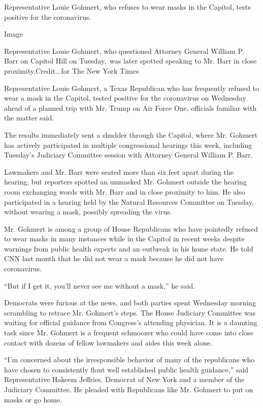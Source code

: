 Representative Louie Gohmert, who refuses to wear masks in the Capitol,
tests positive for the coronavirus.

Image

Representative Louie Gohmert, who questioned Attorney General William P.
Barr on Capitol Hill on Tuesday,~was later spotted speaking to Mr. Barr
in close proximity.Credit...for The New York Times

Representative Louie Gohmert, a Texas Republican who has frequently
refused to wear a mask in the Capitol, tested positive for the
coronavirus on Wednesday ahead of a planned trip with Mr. Trump on Air
Force One, officials familiar with the matter said.

The results immediately sent a shudder through the Capitol, where Mr.
Gohmert has actively participated in multiple congressional hearings
this week, including Tuesday's Judiciary Committee session with Attorney
General William P. Barr.

Lawmakers and Mr. Barr were seated more than six feet apart during the
hearing, but reporters spotted an unmasked Mr. Gohmert outside the
hearing room exchanging words with Mr. Barr and in close proximity to
him. He also participated in a hearing held by the Natural Resources
Committee on Tuesday, without wearing a mask, possibly spreading the
virus.

Mr. Gohmert is among a group of House Republicans who have pointedly
refused to wear masks in many instances while in the Capitol in recent
weeks despite warnings from public health experts and an outbreak in his
home state. He told CNN last month that he did not wear a mask because
he did not have coronavirus.

``But if I get it, you'll never see me without a mask,'' he said.

Democrats were furious at the news, and both parties spent Wednesday
morning scrambling to retrace Mr. Gohmert's steps. The House Judiciary
Committee was waiting for official guidance from Congress's attending
physician. It is a daunting task since Mr. Gohmert is a frequent
schmoozer who could have come into close contact with dozens of fellow
lawmakers and aides this week alone.

``I'm concerned about the irresponsible behavior of many of the
republicans who have chosen to consistently flout well established
public health guidance,'' said Representative Hakeem Jeffries, Democrat
of New York and a member of the Judiciary Committee. He pleaded with
Republicans like Mr. Gohmert to put on masks or go home.

